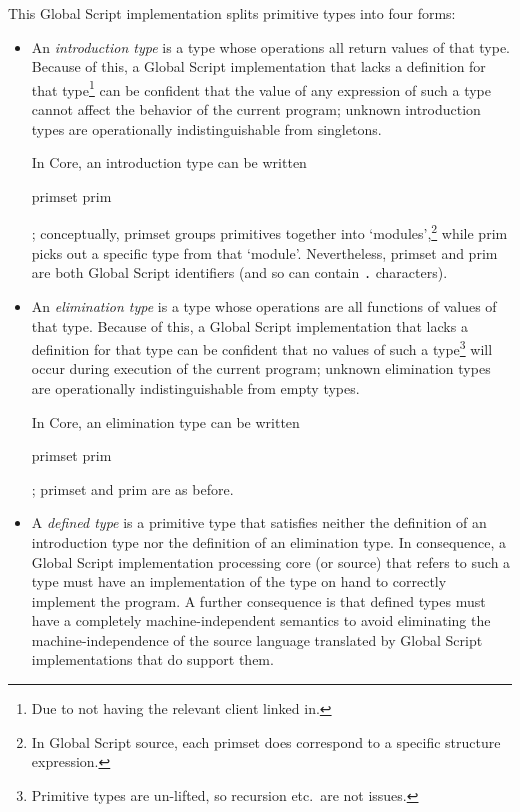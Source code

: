 \documentclass{report}
\newcommand\defn[1]{\emph{#1}}
\newcommand\crkwd[1]{\hskwd{"#1}}
\newcommand\primintrtype{\crkwd{primintrtype}}
\newcommand\primelimtype{\crkwd{primelimtype}}
\begin{document}
This Global Script implementation splits primitive types into four forms:
\begin{itemize}
    \item An \defn{introduction type} is a type whose operations all return values of that type.
        Because of this, a Global Script implementation that lacks a definition for that type\footnote{Due to not having the relevant client linked in.}
        can be confident that the value of any expression of such a type cannot affect the behavior of the current program;
        unknown introduction types are operationally indistinguishable from singletons.

        In Core, an introduction type can be written
        \begin{haskell} \primintrtype primset prim \end{haskell};
        conceptually, \<primset\> groups primitives together into `modules',\footnote{In Global Script source, each primset does correspond to a specific structure expression.}
        while \<prim\> picks out a specific type from that `module'.
        Nevertheless, \<primset\> and \<prim\> are both Global Script identifiers (and so can contain \verb+.+ characters).

    \item An \defn{elimination type} is a type whose operations are all functions of values of that type.
        Because of this, a Global Script implementation that lacks a definition for that type
        can be confident that no values of such a type\footnote{Primitive types are un-lifted, so recursion etc.~are not issues.} will occur during execution of the current program;
        unknown elimination types are operationally indistinguishable from empty types.

        In Core, an elimination type can be written
        \begin{haskell} \primelimtype primset prim \end{haskell};
        \<primset\> and \<prim\> are as before.

    \item A \defn{defined type} is a primitive type that satisfies neither the definition of an introduction type nor the definition of an elimination type.
        In consequence, a Global Script implementation processing core (or source) that refers to such a type must have an implementation of the type on hand to correctly implement the program.
        A further consequence is that defined types must have a completely machine-independent semantics to avoid eliminating the machine-independence of the source language translated by Global Script implementations that do support them.


\end{itemize}
\end{document}
